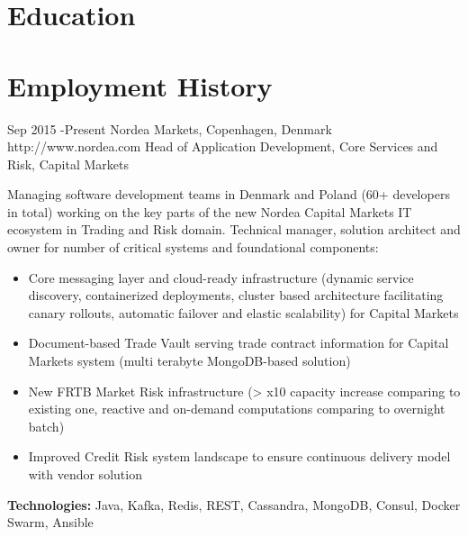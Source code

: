 \documentclass[10pt]{article} %
\begin{document}

\section{Education}





\section{Employment History}

\job
{Sep 2015 -}{Present}
{Nordea Markets, Copenhagen, Denmark}
{http://www.nordea.com}
{Head of Application Development, Core Services and Risk, Capital Markets}
{Managing software development teams in Denmark and Poland (60+ developers in total) working on the key parts of the new Nordea Capital Markets IT ecosystem in Trading 
and Risk domain. Technical manager, solution architect and owner for number of critical systems and 
foundational components:
\begin{itemize}
\item{Core messaging layer and cloud-ready infrastructure (dynamic service discovery, containerized deployments, cluster based architecture facilitating canary rollouts, automatic failover and elastic scalability) for Capital Markets}
\item{Document-based Trade Vault serving trade contract information for Capital Markets system (multi
terabyte MongoDB-based solution)}
\item{New FRTB Market Risk infrastructure (> x10 capacity increase comparing to existing one,
reactive and on-demand computations comparing to overnight batch)}
\item{Improved Credit Risk system landscape to ensure continuous delivery model with vendor solution}
\end{itemize}

\rule{0mm}{5mm}\textbf{Technologies:} Java, Kafka, Redis, REST, Cassandra, MongoDB, Consul, Docker Swarm, Ansible}
\end{document}
